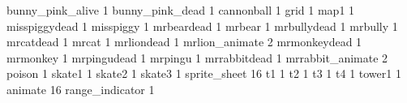 bunny_pink_alive 1
bunny_pink_dead 1
cannonball 1
grid 1
map1 1
misspiggydead 1
misspiggy 1
mrbeardead 1
mrbear 1
mrbullydead 1
mrbully 1
mrcatdead 1
mrcat 1
mrliondead 1
mrlion_animate 2
mrmonkeydead 1
mrmonkey 1
mrpingudead 1
mrpingu 1
mrrabbitdead 1
mrrabbit_animate 2
poison 1
skate1 1
skate2 1
skate3 1
sprite_sheet 16
t1 1
t2 1
t3 1
t4 1
tower1 1
animate 16
range_indicator 1

